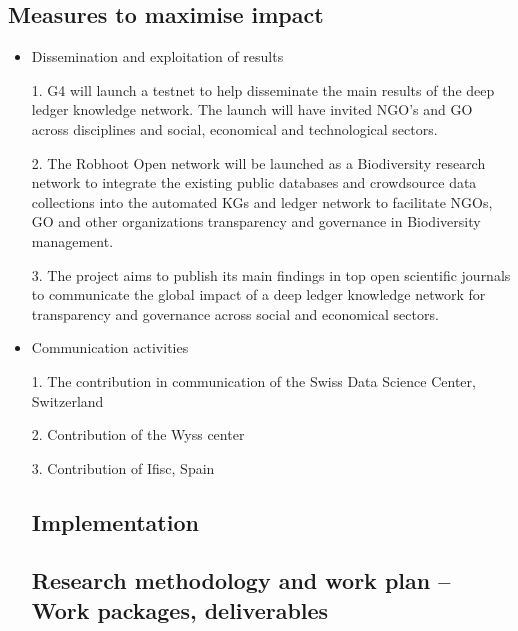 \documentclass[12pt, a4paper]{article} %
\begin{document}
\begin{itemize}
\begin{itemize}
\subsection{Measures to maximise impact}

  \begin{itemize}
  \item Dissemination and exploitation of results

    1. G4 will launch a testnet to help disseminate the main results
    of the deep ledger knowledge network. The launch will have invited
    NGO’s and GO across disciplines and social, economical and
    technological sectors.

    2. The Robhoot Open network will be launched as a Biodiversity
    research network to integrate the existing public databases and
    crowdsource data collections into the automated KGs and ledger
    network to facilitate NGOs, GO and other organizations
    transparency and governance in Biodiversity management.

    3. The project aims to publish its main findings in top open
    scientific journals to communicate the global impact of a deep
    ledger knowledge network for transparency and governance across
    social and economical sectors.

\item Communication activities

  1. The contribution in communication of the Swiss Data Science Center, Switzerland

  2. Contribution of the Wyss center

  3. Contribution of Ifisc, Spain

\section{Implementation}

\subsection{Research methodology and work plan – Work packages,
  deliverables}


\end{itemize}
\end{itemize}
\end{itemize}
\end{document}
